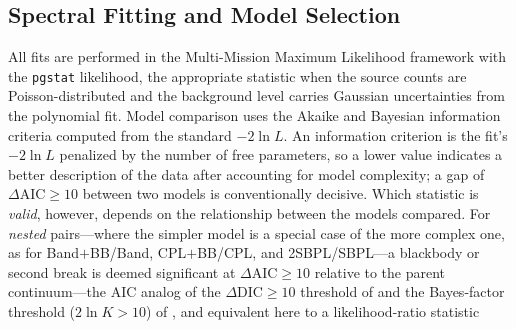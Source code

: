 \documentclass[twocolumn]{aastex631}
\newcommand{\daic}{\ensuremath{\Delta\mathrm{AIC}}}
\begin{document}
\subsection{Spectral Fitting and Model Selection} \label{sec:fit}
All fits are performed in the Multi-Mission Maximum Likelihood framework
\citep[3ML;][]{Vianello2015} with the \texttt{pgstat} likelihood, the
appropriate statistic when the source counts are Poisson-distributed and the
background level carries Gaussian uncertainties from the polynomial fit. Model
comparison uses the Akaike and Bayesian information criteria
\citep[AIC, BIC;][]{Akaike1974,Schwarz1978} computed from the standard
$-2\ln L$. An information criterion is the fit's $-2\ln L$ penalized by the
number of free parameters, so a lower value indicates a better description of
the data after accounting for model complexity; a gap of $\daic\ge10$ between
two models is conventionally decisive. Which statistic is \emph{valid},
however, depends on the relationship between the models compared. For \emph{nested} pairs---where the simpler model is a special case of the
more complex one, as for Band$+$BB/Band, CPL$+$BB/CPL, and 2SBPL/SBPL---a
blackbody or second break is deemed significant at $\daic\ge10$ relative to the
parent continuum---the AIC analog of the $\Delta\mathrm{DIC}\ge10$ threshold of
\citet{Li2021} and the Bayes-factor threshold ($2\ln K>10$) of
\citet{Burgess2019}, and equivalent here to a likelihood-ratio statistic
\end{document}
